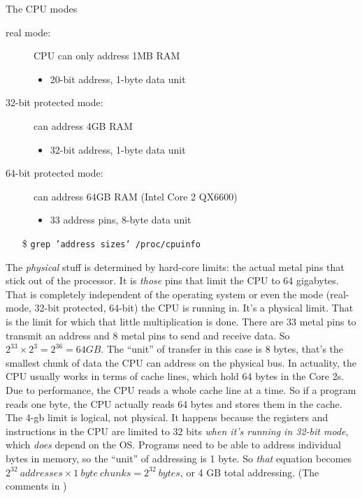 
\begin{frame}%
  \begin{block}{The CPU modes}
    \begin{description}
    \item[real mode:] CPU can only address 1MB RAM
      \begin{itemize}
      \item 20-bit address, 1-byte data unit
      \end{itemize}
    \item[32-bit protected mode:] can address 4GB RAM
      \begin{itemize}
      \item 32-bit address, 1-byte data unit
      \end{itemize}
    \item[64-bit protected mode:] can address 64GB RAM (Intel Core 2 QX6600)
      \begin{itemize}
      \item 33 address pins, 8-byte data unit
      \end{itemize}
    \end{description}
  \end{block}
  \begin{itemize}
  \item[\$] \texttt{grep 'address sizes' /proc/cpuinfo}
  \end{itemize}
\end{frame}

The \emph{physical} stuff is determined by hard-core limits: the actual metal pins that
stick out of the processor. It is \emph{those} pins that limit the CPU to 64
gigabytes. That is completely independent of the operating system or even the mode
(real-mode, 32-bit protected, 64-bit) the CPU is running in. It's a physical limit. That
is the limit for which that little multiplication is done. There are 33 metal pins to
transmit an address and 8 metal pins to send and receive data. So
$2^{33}\times{} 2^3 = 2^{36} = 64 GB$.  The “unit” of transfer in this case is 8 bytes,
that's the smallest chunk of data the CPU can address on the physical bus. In actuality,
the CPU usually works in terms of cache lines, which hold 64 bytes in the Core 2s. Due to
performance, the CPU reads a whole cache line at a time. So if a program reads one byte,
the CPU actually reads 64 bytes and stores them in the cache.  The 4-gb limit is logical,
not physical. It happens because the registers and instructions in the CPU are limited to
32 bits \emph{when it's running in 32-bit mode}, which \emph{does} depend on the
OS. Programs need to be able to address individual bytes in memory, so the “unit” of
addressing is 1 byte. So \emph{that} equation becomes
$2^{32}\ addresses \times{} 1\ byte\ chunks = 2^{32}\ bytes$, or 4 GB total
addressing. (The comments in )

